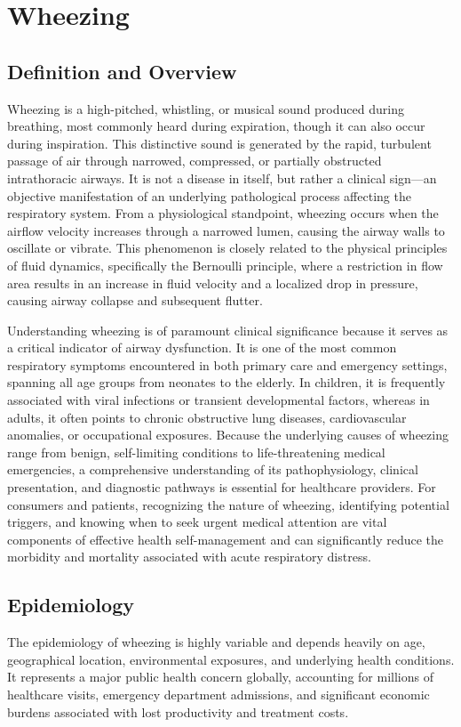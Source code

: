 \chapter{Wheezing}

\section*{Definition and Overview}
Wheezing is a high-pitched, whistling, or musical sound produced during breathing, most commonly heard during expiration, though it can also occur during inspiration. This distinctive sound is generated by the rapid, turbulent passage of air through narrowed, compressed, or partially obstructed intrathoracic airways. It is not a disease in itself, but rather a clinical sign---an objective manifestation of an underlying pathological process affecting the respiratory system. From a physiological standpoint, wheezing occurs when the airflow velocity increases through a narrowed lumen, causing the airway walls to oscillate or vibrate. This phenomenon is closely related to the physical principles of fluid dynamics, specifically the Bernoulli principle, where a restriction in flow area results in an increase in fluid velocity and a localized drop in pressure, causing airway collapse and subsequent flutter.

Understanding wheezing is of paramount clinical significance because it serves as a critical indicator of airway dysfunction. It is one of the most common respiratory symptoms encountered in both primary care and emergency settings, spanning all age groups from neonates to the elderly. In children, it is frequently associated with viral infections or transient developmental factors, whereas in adults, it often points to chronic obstructive lung diseases, cardiovascular anomalies, or occupational exposures. Because the underlying causes of wheezing range from benign, self-limiting conditions to life-threatening medical emergencies, a comprehensive understanding of its pathophysiology, clinical presentation, and diagnostic pathways is essential for healthcare providers. For consumers and patients, recognizing the nature of wheezing, identifying potential triggers, and knowing when to seek urgent medical attention are vital components of effective health self-management and can significantly reduce the morbidity and mortality associated with acute respiratory distress.

\section*{Epidemiology}
The epidemiology of wheezing is highly variable and depends heavily on age, geographical location, environmental exposures, and underlying health conditions. It represents a major public health concern globally, accounting for millions of healthcare visits, emergency department admissions, and significant economic burdens associated with lost productivity and treatment costs.

